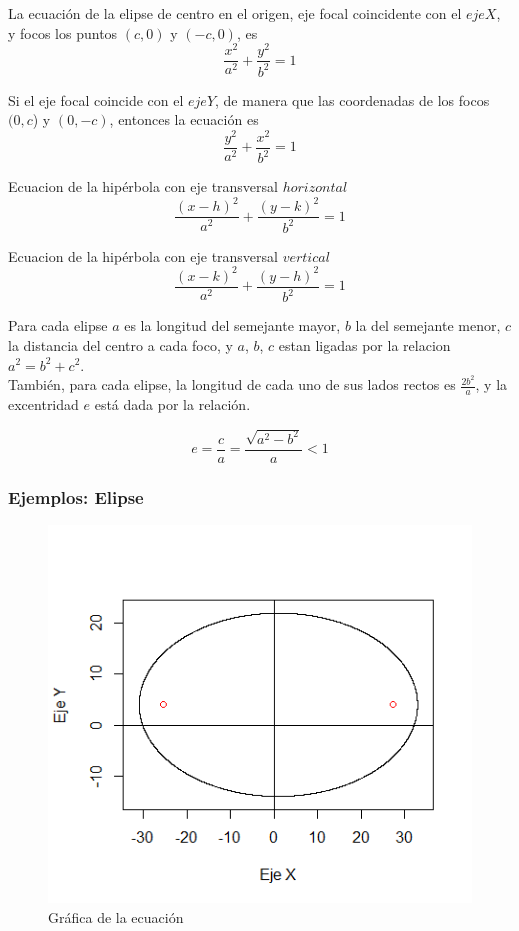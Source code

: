\documentclass[12pt,a4paper]{article} %
\begin{document}
La ecuación de la elipse de centro en el origen, eje focal coincidente con el $eje X$, y focos los puntos $(c,0)$ y $(-c,0)$, es
$$ {\frac{x^2}{a^2} + \frac{y^2}{b^2} = 1} $$

Si el eje focal coincide con el $eje Y$, de manera que las coordenadas de los focos $(0,c$) y $(0,-c)$, entonces la ecuación es 
$$ {\frac{y^2}{a^2} + \frac{x^2}{b^2} = 1} $$

Ecuacion de la hipérbola con eje transversal $horizontal$
$$ {\frac{(x - h)^2}{a^2} + \frac{(y - k)^2}{b^2} = 1} $$

Ecuacion de la hipérbola con eje transversal $vertical$
$$ {\frac{(x - k)^2}{a^2} + \frac{(y - h)^2}{b^2} = 1} $$

Para cada elipse $a$ es la longitud del semejante mayor, $b$ la del semejante menor, $c$ la distancia del centro a cada foco, y $a$, $b$, $c$ estan ligadas por la relacion $a^2 = b^2 + c^2$.
\\También, para cada elipse, la longitud de cada uno de sus lados rectos es $\frac{2b^2}{a}$, y la excentridad $e$ está dada por la relación.

$$e = \frac{c}{a} = \frac{\sqrt{a^2 - b^2}}{a} < 1$$

\subsubsection{Ejemplos: Elipse}

\begin{figure}[h]
\centering
\includegraphics[scale=0.7]{Elipse1}
\caption{Gráfica de la ecuación }
\label{fig:Elipse}
\end{figure}
\end{document}
